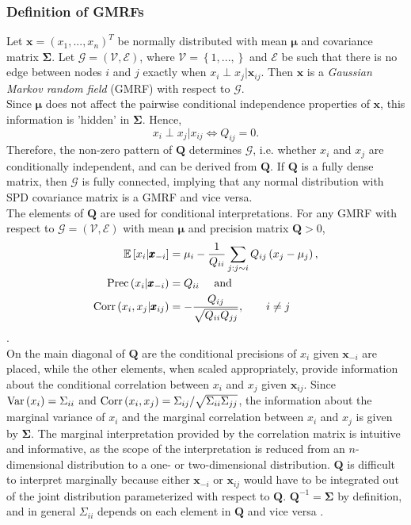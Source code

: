 \subsubsection{Definition of GMRFs}
Let $\pmb{x}=\left(x_1,...,x_n\right)^T$ be normally distributed with mean $\pmb{\mu}$ and covariance matrix $\pmb{\Sigma}$. Let $\mathcal{G}=\left(\mathcal{V}, \mathcal{E}\right)$, where $\mathcal{V}=\left\lbrace 1,...,\right\rbrace$ and $\mathcal{E}$ be such that there is no edge between nodes $i$ and $j$ exactly when $x_i\perp x_j|\pmb{x}_{ij}$. Then $\pmb{x}$ is a \textit{Gaussian Markov random field} (GMRF) with respect to $\mathcal{G}$. \\
Since $\pmb{\mu}$ does not affect the pairwise conditional independence properties of $\pmb{x}$, this information is 'hidden' in $\pmb{\Sigma}$. Hence,
\begin{equation*}
    x_i\perp x_j|x_{ij}\Longleftrightarrow Q_{ij}=0.
\end{equation*}
Therefore, the non-zero pattern of $\pmb{Q}$ determines $\mathcal{G}$, i.e. whether $x_i$ and $x_j$ are conditionally independent, and can be derived from $\pmb{Q}$. If $\pmb{Q}$ is a fully dense matrix, then $\mathcal{G}$ is fully connected, implying that any normal distribution with SPD covariance matrix is a GMRF and vice versa. \\
The elements of $\pmb{Q}$ are used for conditional interpretations. For any GMRF with respect to $\mathcal{G}=\left(\mathcal{V}, \mathcal{E}\right)$ with mean $\pmb{\mu}$ and precision matrix $\pmb{Q} > 0$,
\begin{align}
    \mathbb{E}\left[x_i|\pmb{x}_{-i}\right] &= \mu_i-\frac{1}{Q_{ii}}\sum_{j:j\sim i}Q_{ij}\left(x_j-\mu_j\right), \label{eq:mean_gmrf}\\
    \hbox{Prec}\left(x_i|\pmb{x}_{-i}\right) &= Q_{ii} \hspace{10pt}\hbox{ and }\label{eq:prec_gmrf}\\
    \hbox{Corr}\left(x_i,x_j|\pmb{x}_{ij}\right) &= -\frac{Q_{ij}}{\sqrt{Q_{ii}Q_{jj}}},\hspace{20pt} i\neq j
\end{align}
\autocite[][21]{rue2005gaussian}. \\
On the main diagonal of $\pmb{Q}$ are the conditional precisions of $x_i$ given $\pmb{x}_{-i}$ are placed, while the other elements, when scaled appropriately, provide information about the conditional correlation between $x_i$ and $x_j$ given $\pmb{x}_{ij}$. Since $\hbox{Var}\left(x_i\right)=\Sigma_{ii}$ and $\hbox{Corr}\left(x_i,x_j\right)=\Sigma_{ij}/\sqrt{\Sigma_{ii}\Sigma_{jj}}$, the information about the marginal variance of $x_i$ and the marginal correlation between $x_i$ and $x_j$ is given by $\pmb{\Sigma}$. The marginal interpretation provided by the correlation matrix is intuitive and informative, as the scope of the interpretation is reduced from an $n$-dimensional distribution to a one- or two-dimensional distribution. $\pmb{Q}$ is difficult to interpret marginally because either $\pmb{x}_{-i}$ or $\pmb{x}_{ij}$ would have to be integrated out of the joint distribution parameterized with respect to $\pmb{Q}$. $\pmb{Q}^{-1}=\pmb{\Sigma}$ by definition, and in general $\Sigma_{ii}$ depends on each element in $\pmb{Q}$ and vice versa \autocite[][20--23]{rue2005gaussian}.
